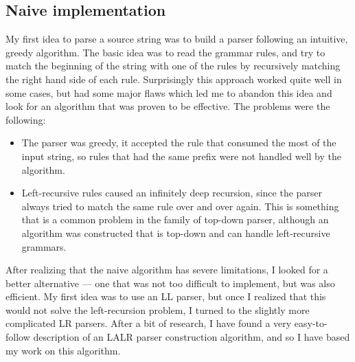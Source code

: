 \subsection{Naive implementation}
My first idea to parse a source string was to build a parser following an intuitive, greedy algorithm. The basic idea was to read the grammar rules, and try to match the beginning of the string with one of the rules by recursively matching the right hand side of each rule. Surprisingly this approach worked quite well in some cases, but had some major flaws which led me to abandon this idea and look for an algorithm that was proven to be effective. The problems were the following:
\begin{itemize}
\item The parser was greedy, it accepted the rule that consumed the most of the input string, so rules that had the same prefix were not handled well by the algorithm.
\item Left-recursive rules caused an infinitely deep recursion, since the parser always tried to match the same rule over and over again. This is something that is a common problem in the family of top-down parser, although an algorithm was constructed \cite{frost2007modular} that is top-down and can handle left-recursive grammars.
\end{itemize}
After realizing that the naive algorithm has severe limitations, I looked for a better alternative --- one that was not too difficult to implement, but was also efficient. My first idea was to use an LL parser, but once I realized that this would not solve the left-recursion problem, I turned to the slightly more complicated LR parsers. After a bit of research, I have found a very easy-to-follow description of an LALR parser construction algorithm, and so I have based my work on this algorithm.
